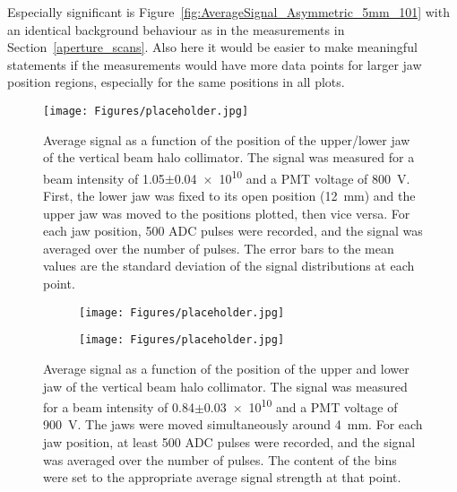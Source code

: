 Especially significant is Figure~\ref{fig:AverageSignal_Asymmetric_5mm_101} with an identical background behaviour as in the measurements in Section~\ref{aperture_scans}. Also here it would be easier to make meaningful statements if the measurements would have more data points for larger jaw position regions, especially for the same positions in all plots.
\begin{figure}
\centering
\texttt{[image: Figures/placeholder.jpg]}%
\caption[RHUL Cherenkov detector signal vs. collimator half aperture]{Average signal as a function of the position of the upper/lower jaw of the vertical beam halo collimator. The signal was measured for a beam intensity of \num{1.05}$\pm$\num{0.04e10} and a PMT voltage of \SI{800}{\volt}. First, the lower jaw was fixed to its open position (\SI{12}{\milli\metre}) and the upper jaw was moved to the positions plotted, then vice versa. For each jaw position, 500 ADC pulses were recorded, and the signal was averaged over the number of pulses. The error bars to the mean values are the standard deviation of the signal distributions at each point.}
\label{fig:AverageSignal_HalfAperture}
\end{figure}
\begin{figure}
\begin{subfigure}[b]{0.5\textwidth}
\texttt{[image: Figures/placeholder.jpg]}%
\end{subfigure}
\begin{subfigure}[b]{0.5\textwidth}
\texttt{[image: Figures/placeholder.jpg]}%
\end{subfigure}
\caption[RHUL Cherenkov detector signal for certain upper/lower jaw positions around \SI{4}{\milli\metre}, for a beam intensity of \num{0.84}$\pm$\num{0.03e10}]{Average signal as a function of the position of the upper and lower jaw of the vertical beam halo collimator. The signal was measured for a beam intensity of \num{0.84}$\pm$\num{0.03e10} and a PMT voltage of \SI{900}{\volt}. The jaws were moved simultaneously around \SI{4}{\milli\metre}. For each jaw position, at least 500 ADC pulses were recorded, and the signal was averaged over the number of pulses. The content of the bins were set to the appropriate average signal strength at that point.}
\label{fig:AverageSignal_Asymmetric_4mm_084}
\end{figure}
